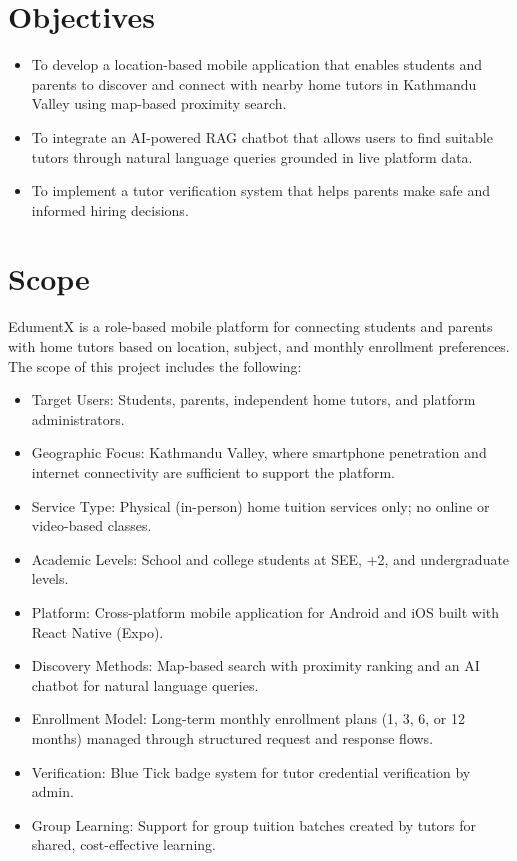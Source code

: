 \documentclass[12pt]{report}
\begin{document}
\section{Objectives}
\begin{itemize}
\item To develop a location-based mobile application that enables students and parents to discover and connect with nearby home tutors in Kathmandu Valley using map-based proximity search.

\item To integrate an AI-powered RAG chatbot that allows users to find suitable tutors through natural language queries grounded in live platform data.

\item To implement a tutor verification system that helps parents make safe and informed hiring decisions.
\end{itemize}

\section{Scope}

EdumentX is a role-based mobile platform for connecting students and parents with home tutors based on location, subject, and monthly enrollment preferences. The scope of this project includes the following:

\begin{itemize}
\item Target Users: Students, parents, independent home tutors, and platform administrators.
\item Geographic Focus: Kathmandu Valley, where smartphone penetration and internet connectivity are sufficient to support the platform.
\item Service Type: Physical (in-person) home tuition services only; no online or video-based classes.
\item Academic Levels: School and college students at SEE, +2, and undergraduate levels.
\item Platform: Cross-platform mobile application for Android and iOS built with React Native (Expo).
\item Discovery Methods: Map-based search with proximity ranking and an AI chatbot for natural language queries.
\item Enrollment Model: Long-term monthly enrollment plans (1, 3, 6, or 12 months) managed through structured request and response flows.
\item Verification: Blue Tick badge system for tutor credential verification by admin.
\item Group Learning: Support for group tuition batches created by tutors for shared, cost-effective learning.
\end{itemize}
\end{document}
